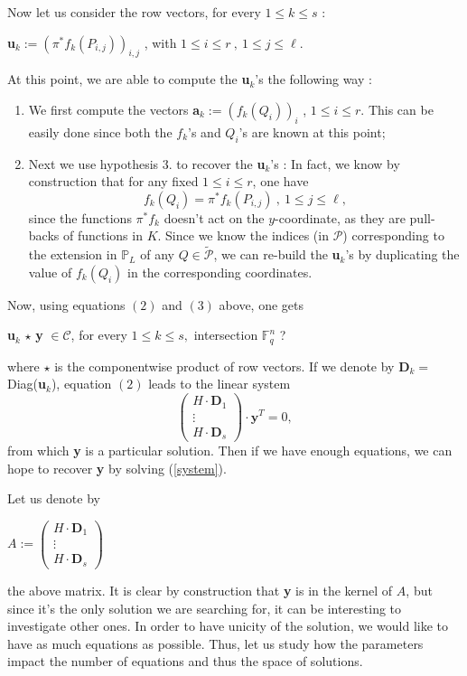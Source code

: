\documentclass[10pt]{article}
\newcommand{\s}{\vspace{0.3cm}}
\newcommand{\cd}{\cdot}
\newcommand{\fq}{\mathbb{F}_q}
\newcommand{\PR}{\mathcal{P}}
\begin{document}
Now let us consider the row vectors, for every $1 \leq k \leq s$ :
\begin{center}
\textbf{u}$_{k}:= \left(\pi^*f_k(P_{i,j})\right)_{i,j}$ , with $1 \leq i \leq r \ , \ 1 \leq j \leq \ell$.
\end{center}

At this point, we are able to compute the \textbf{u}$_{k}$'s the following way :
\begin{enumerate}
\item We first compute the vectors \textbf{a}$_{k} := (f_k(Q_i))_i$ , $1 \leq i \leq r$. This can be easily done since both the $f_k$'s and $Q_i$'s are known at this point;
\item Next we use hypothesis $3.$ to recover the \textbf{u}$_{k}$'s : In fact, we know by construction that for any fixed $1 \leq i \leq r$, one have 
\[f_k(Q_i) = \pi^*f_k(P_{i,j}) \ , \ 1 \leq j \leq \ell,\]
since the functions $\pi^*f_k$ doesn't act on the $y$-coordinate, as they are pull-backs of functions in $K$. Since we know the indices (in $\PR$) corresponding to the extension in $\mathbb{P}_L$ of any $Q \in \tilde{\PR}$, we can re-build the \textbf{u}$_{k}$'s by duplicating the value of $f_k(Q_i)$ in the corresponding coordinates.
\end{enumerate}

Now, using equations $(2)$ and $(3)$ above, one gets 
\begin{center}
\textbf{u}$_{k}$ $\star$ \textbf{y} $\in \mathcal{C}$, for every $1 \leq k \leq s,$ \color{red} intersection $\fq^n$ ? \color{black}
\end{center}
where $\star$ is the componentwise product of row vectors.
If we denote by \textbf{D}$_{k} = $ Diag(\textbf{u}$_{k}$), equation $(2)$ leads to the linear system 
\begin{equation} \label{system}
\begin{pmatrix}
H \cd \textbf{D}_1 \\
\vdots \\
H \cd \textbf{D}_s
\end{pmatrix}
\cd \textbf{y}^T = 0, 
\end{equation}
from which \textbf{y} is a particular solution.
Then if we have enough equations, we can hope to recover \textbf{y} by solving (\ref{system}). 

\s

 Let us denote by
\begin{center}
$A := \begin{pmatrix}
H \cd \textbf{D}_1 \\
\vdots \\
H \cd \textbf{D}_s
\end{pmatrix}
$
\end{center}
the above matrix. It is clear by construction that \textbf{y} is in the kernel of $A$, but since it's the only solution we are searching for, it can be interesting to investigate other ones. In order to have unicity of the solution, we would like to have as much equations as possible. Thus, let us study how the parameters impact the number of equations and thus the space of solutions.
\end{document}
